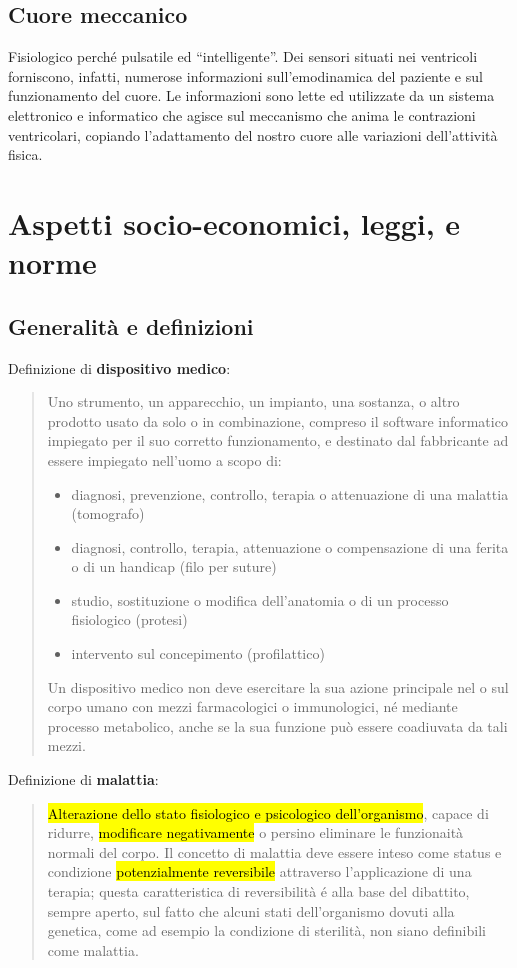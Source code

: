 \documentclass[a4paper]{article}
\begin{document}
\subsection{Cuore meccanico}
Fisiologico perché pulsatile ed “intelligente”. Dei sensori situati nei 
ventricoli forniscono, infatti, numerose informazioni sull’emodinamica del 
paziente e sul funzionamento del cuore. Le informazioni sono lette ed 
utilizzate da un sistema elettronico e informatico che agisce sul meccanismo 
che anima le contrazioni ventricolari, copiando l’adattamento del nostro 
cuore alle variazioni dell’attività fisica.

\section{Aspetti socio-economici, leggi, e norme}
\subsection{Generalità e definizioni}
Definizione di \textbf{dispositivo medico}:
\begin{quote}
    \centering
    Uno strumento, un apparecchio, un impianto, una sostanza, o altro prodotto 
    usato da solo o in combinazione, compreso il software informatico impiegato 
    per il suo corretto funzionamento, e destinato dal fabbricante ad essere 
    impiegato nell'uomo a scopo di:
    \begin{itemize}
        \item diagnosi, prevenzione, controllo, terapia o attenuazione di una 
        malattia (tomografo)
        \item diagnosi, controllo, terapia, attenuazione o compensazione di 
        una ferita o di un handicap (filo per suture)
        \item studio, sostituzione o modifica dell'anatomia o di un processo 
        fisiologico (protesi)
        \item intervento sul concepimento (profilattico)
    \end{itemize}
    Un dispositivo medico non deve esercitare la sua azione principale nel o 
    sul corpo umano con mezzi farmacologici o immunologici, né mediante processo 
    metabolico, anche se la sua funzione può essere coadiuvata da tali mezzi. 
\end{quote}
Definizione di \textbf{malattia}:
\begin{quote}
    \centering
    \hl{Alterazione dello stato fisiologico e psicologico dell'organismo}, capace di 
    ridurre, \hl{modificare negativamente} o persino eliminare le funzionaità normali 
    del corpo. Il concetto di malattia deve essere inteso come status e condizione 
    \hl{potenzialmente reversibile} attraverso l'applicazione di una terapia; questa 
    caratteristica di reversibilità é alla base del dibattito, sempre aperto, sul 
    fatto che alcuni stati dell'organismo dovuti alla genetica, come ad esempio la 
    condizione di sterilità, non siano definibili come malattia.
\end{quote}
\end{document}
